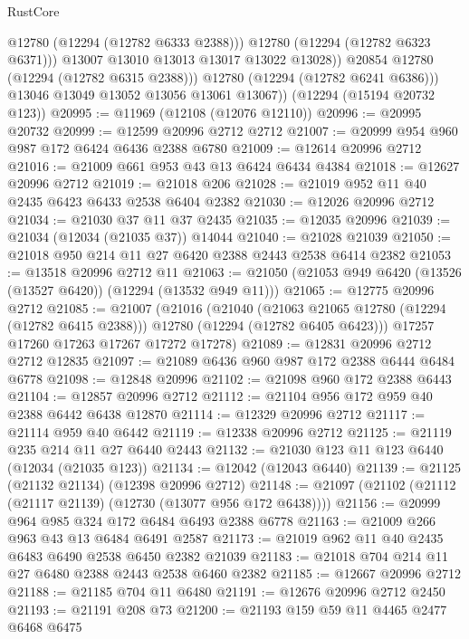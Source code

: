 \begin{lexlean}{RustCore}
\begin{coremodule}
                    @12780
                    (@12294 (@12782 @6333 @2388)))
                  @12780
                  (@12294 (@12782 @6323 @6371)))
                @13007
                @13010
                @13013
                @13017
                @13022
                @13028))
            @20854
            @12780
            (@12294 (@12782 @6315 @2388)))
          @12780
          (@12294 (@12782 @6241 @6386)))
        @13046
        @13049
        @13052
        @13056
        @13061
        @13067))
    (@12294 (@15194 @20732 @123))
@20995 := @11969 (@12108 (@12076 @12110))
@20996 := @20995 @20732
@20999 := @12599 @20996 @2712 @2712
@21007 := @20999 @954 @960 @987 @172 @6424 @6436 @2388 @6780
@21009 := @12614 @20996 @2712
@21016 := @21009 @661 @953 @43 @13 @6424 @6434 @4384
@21018 := @12627 @20996 @2712
@21019 := @21018 @206
@21028 := @21019 @952 @11 @40 @2435 @6423 @6433 @2538 @6404 @2382
@21030 := @12026 @20996 @2712
@21034 := @21030 @37 @11 @37 @2435
@21035 := @12035 @20996
@21039 := @21034 (@12034 (@21035 @37)) @14044
@21040 := @21028 @21039
@21050 := @21018 @950 @214 @11 @27 @6420 @2388 @2443 @2538 @6414 @2382
@21053 := @13518 @20996 @2712 @11
@21063 := @21050 (@21053 @949 @6420 (@13526 (@13527 @6420)) (@12294 (@13532 @949 @11)))
@21065 := @12775 @20996 @2712
@21085 := @21007
    (@21016
      (@21040
        (@21063 @21065 @12780 (@12294 (@12782 @6415 @2388)))
        @12780
        (@12294 (@12782 @6405 @6423)))
      @17257
      @17260
      @17263
      @17267
      @17272
      @17278)
@21089 := @12831 @20996 @2712 @2712 @12835
@21097 := @21089 @6436 @960 @987 @172 @2388 @6444 @6484 @6778
@21098 := @12848 @20996
@21102 := @21098 @960 @172 @2388 @6443
@21104 := @12857 @20996 @2712
@21112 := @21104 @956 @172 @959 @40 @2388 @6442 @6438 @12870
@21114 := @12329 @20996 @2712
@21117 := @21114 @959 @40 @6442
@21119 := @12338 @20996 @2712
@21125 := @21119 @235 @214 @11 @27 @6440 @2443
@21132 := @21030 @123 @11 @123 @6440 (@12034 (@21035 @123))
@21134 := @12042 (@12043 @6440)
@21139 := @21125 (@21132 @21134) (@12398 @20996 @2712)
@21148 := @21097 (@21102 (@21112 (@21117 @21139) (@12730 (@13077 @956 @172 @6438))))
@21156 := @20999 @964 @985 @324 @172 @6484 @6493 @2388 @6778
@21163 := @21009 @266 @963 @43 @13 @6484 @6491 @2587
@21173 := @21019 @962 @11 @40 @2435 @6483 @6490 @2538 @6450 @2382 @21039
@21183 := @21018 @704 @214 @11 @27 @6480 @2388 @2443 @2538 @6460 @2382
@21185 := @12667 @20996 @2712
@21188 := @21185 @704 @11 @6480
@21191 := @12676 @20996 @2712 @2450
@21193 := @21191 @208 @73
@21200 := @21193 @159 @59 @11 @4465 @2477 @6468 @6475

\end{coremodule}
\end{lexlean}
